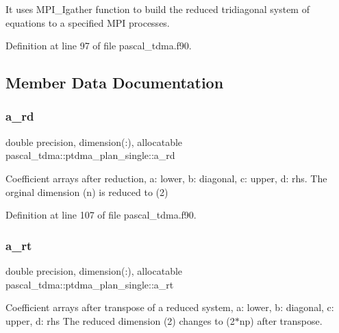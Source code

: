 It uses M\+P\+I\+\_\+\+Igather function to build the reduced tridiagonal system of equations to a specified M\+PI processes. 

Definition at line 97 of file pascal\+\_\+tdma.\+f90.



\subsection{Member Data Documentation}
\mbox{\label{structpascal__tdma_1_1ptdma__plan__single_a732d93dcbef429c1396a6f7ace9cefa6}} 
\subsubsection{\texorpdfstring{a\_rd}{a\_rd}}
{\footnotesize\ttfamily double precision, dimension(\+:), allocatable pascal\+\_\+tdma\+::ptdma\+\_\+plan\+\_\+single\+::a\+\_\+rd}



Coefficient arrays after reduction, a\+: lower, b\+: diagonal, c\+: upper, d\+: rhs. The orginal dimension (n) is reduced to (2) 



Definition at line 107 of file pascal\+\_\+tdma.\+f90.

\mbox{\label{structpascal__tdma_1_1ptdma__plan__single_ad8bed95f594c23d7df9467e204025a74}} 
\subsubsection{\texorpdfstring{a\_rt}{a\_rt}}
{\footnotesize\ttfamily double precision, dimension(\+:), allocatable pascal\+\_\+tdma\+::ptdma\+\_\+plan\+\_\+single\+::a\+\_\+rt}



Coefficient arrays after transpose of a reduced system, a\+: lower, b\+: diagonal, c\+: upper, d\+: rhs The reduced dimension (2) changes to (2$\ast$np) after transpose. 



